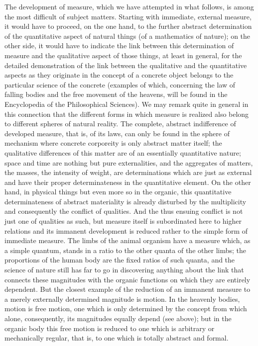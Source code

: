 The development of measure,
which we have attempted in what follows,
is among the most difficult of subject matters.
Starting with immediate, external measure,
it would have to proceed, on the one hand,
to the further abstract determination of
the quantitative aspect of natural things
(of a mathematics of nature);
on the other side, it would have to indicate the link
between this determination of measure
and the qualitative aspect of those things,
at least in general, for the detailed demonstration of the
link between the qualitative and the quantitative aspects
as they originate in the concept of a concrete object
belongs to the particular science of the concrete
(examples of which, concerning the law of falling bodies
and the free movement of the heavens,
will be found in the Encyclopedia of the Philosophical Sciences).
We may remark quite in general in this connection
that the different forms in which measure is realized
also belong to different spheres of natural reality.
The complete, abstract indifference of developed measure,
that is, of its laws, can only be found in the sphere of mechanism
where concrete corporeity is only abstract matter itself;
the qualitative differences of this matter are
of an essentially quantitative nature;
space and time are nothing but pure externalities,
and the aggregates of matters, the masses, the intensity of weight,
are determinations which are just as external
and have their proper determinateness in the quantitative element.
On the other hand, in physical things but even more so in the organic,
this quantitative determinateness of abstract materiality is
already disturbed by the multiplicity
and consequently the conflict of qualities.
And the thus ensuing conflict is not just one of qualities as such,
but measure itself is subordinated here to higher relations
and its immanent development is reduced rather to
the simple form of immediate measure.
The limbs of the animal organism have a measure
which, as a simple quantum, stands
in a ratio to the other quanta of the other limbs;
the proportions of the human body are the fixed ratios of such quanta,
and the science of nature still has far to go in
discovering anything about the link that connects
these magnitudes with the organic functions
on which they are entirely dependent.
But the closest example of the reduction of an immanent
measure to a merely externally determined magnitude is motion.
In the heavenly bodies, motion is free motion,
one which is only determined by the concept from which alone,
consequently, its magnitudes equally depend (see above);
but in the organic body this free motion is reduced
to one which is arbitrary or mechanically regular,
that is, to one which is totally abstract and formal.

